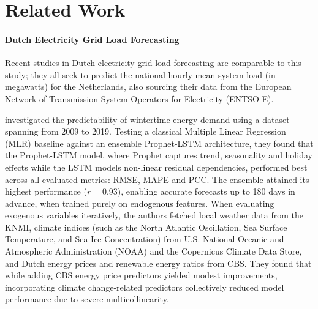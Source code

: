 \section{Related Work}
\label{sec:related_work}

\paragraph{Dutch Electricity Grid Load Forecasting} 
Recent studies in Dutch electricity grid load forecasting \cite{van_de_sande_enhancing_2024,ashtar_hybrid_2025,curiel_integrating_2025} are comparable to this study; they all seek to predict the national hourly mean system load (in megawatts) for the Netherlands, also sourcing their data from the European Network of Transmission System Operators for Electricity (ENTSO-E).

\cite{van_de_sande_enhancing_2024} investigated the predictability of wintertime energy demand using a dataset spanning from 2009 to 2019. Testing a classical Multiple Linear Regression (MLR) baseline against an ensemble Prophet-LSTM architecture, they found that the Prophet-LSTM model, where Prophet captures trend, seasonality and holiday effects while the LSTM models non-linear residual dependencies, performed best across all evaluated metrics: RMSE, MAPE and PCC. The ensemble attained its highest performance ($r=0.93$), enabling accurate forecasts up to 180 days in advance, when trained purely on endogenous features. When evaluating exogenous variables iteratively, the authors fetched local weather data from the KNMI, climate indices (such as the North Atlantic Oscillation, Sea Surface Temperature, and Sea Ice Concentration) from U.S. National Oceanic and Atmospheric Administration (NOAA) and the Copernicus Climate Data Store, and Dutch energy prices and renewable energy ratios from CBS. They found that while adding CBS energy price predictors yielded modest improvements, incorporating climate change-related predictors collectively reduced model performance due to severe multicollinearity.

